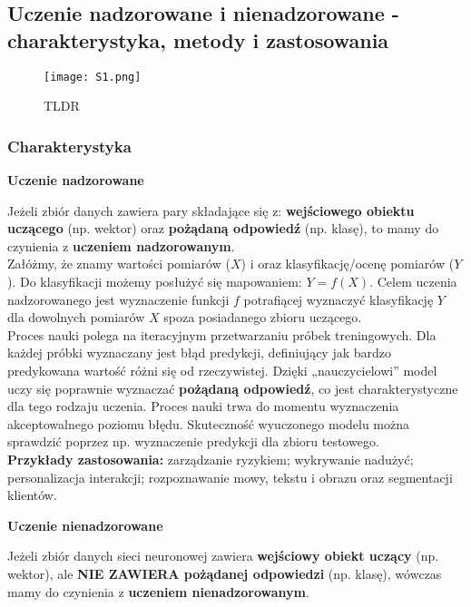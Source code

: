 \subsection{Uczenie nadzorowane i nienadzorowane - charakterystyka, metody i zastosowania}

\begin{figure}[H]
	\centering
	\texttt{[image: S1.png]}
	\caption{TLDR}
\end{figure}

\subsubsection{Charakterystyka}

\centerline{\textbf{Uczenie nadzorowane}}

Jeżeli zbiór danych zawiera pary składające się z: \textbf{wejściowego obiektu uczącego} (np. wektor) oraz \textbf{pożądaną odpowiedź} (np. klasę), to mamy do czynienia z \textbf{uczeniem nadzorowanym}. \\

Załóżmy, że znamy wartości pomiarów ($X$) i oraz klasyfikację/ocenę pomiarów ($Y$). Do klasyfikacji możemy posłużyć się mapowaniem: $Y=f(X)$. Celem uczenia nadzorowanego jest wyznaczenie funkcji $f$ potrafiącej wyznaczyć klasyfikację $Y$ dla dowolnych pomiarów $X$ spoza posiadanego zbioru uczącego. \\

Proces nauki polega na iteracyjnym przetwarzaniu próbek treningowych. Dla każdej próbki wyznaczany jest błąd predykcji, definiujący jak bardzo predykowana wartość różni się od rzeczywistej. Dzięki „nauczycielowi” model uczy się poprawnie wyznaczać \textbf{pożądaną odpowiedź}, co jest charakterystyczne dla tego rodzaju uczenia. Proces nauki trwa do momentu wyznaczenia akceptowalnego poziomu błędu. Skuteczność wyuczonego modelu można sprawdzić poprzez np. wyznaczenie predykcji dla zbioru testowego. \\

\textbf{Przykłady zastosowania:} zarządzanie ryzykiem; wykrywanie nadużyć; personalizacja interakcji; rozpoznawanie mowy, tekstu i obrazu oraz segmentacji klientów. \\

\centerline{\textbf{Uczenie nienadzorowane}}

Jeżeli zbiór danych sieci neuronowej zawiera\textbf{ wejściowy obiekt uczący} (np. wektor), ale \textbf{NIE ZAWIERA pożądanej odpowiedzi} (np. klasę), wówczas mamy do czynienia z \textbf{uczeniem nienadzorowanym}. \\

